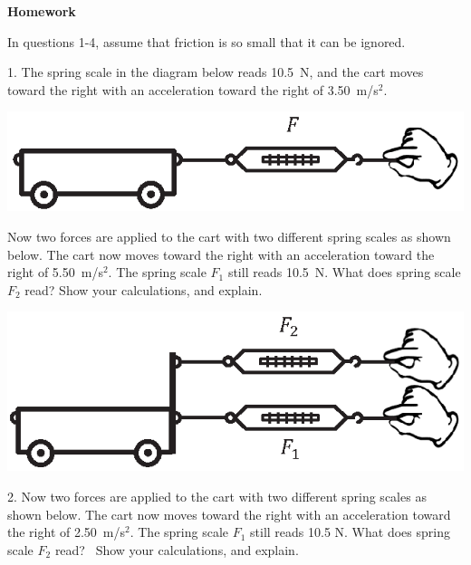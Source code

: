 \textbf{Homework}

In questions 1-4, assume that friction is so small that it can be ignored.

1. The spring scale in the diagram below reads 10.5~N, and 
the cart moves toward the right with an acceleration toward the right of 3.50~m/s$^2$. 

\begin{center}
\includegraphics{force_mass/cart_plus_scale.eps}
\end{center}

Now two forces are applied to the cart with two different spring scales
as shown below. The cart now moves toward the right with an acceleration toward the right of
5.50~m/s$^2$. The spring scale \( F_{1} \) still reads 10.5~N. 
What does spring scale \( F_{2} \) read? Show your calculations,
and explain.

\includegraphics{force_mass/cart_plus_two_scales_same_side.eps}


\answerspace{25mm}

2. Now two forces are applied to the cart with two different spring scales as
shown below. The cart now moves toward the right with an acceleration toward the right of
2.50~m/s$^2$. The spring scale \( F_{1} \) still reads 10.5 N. What does spring scale \( F_{2} \) read?~ Show your calculations,
and explain.

